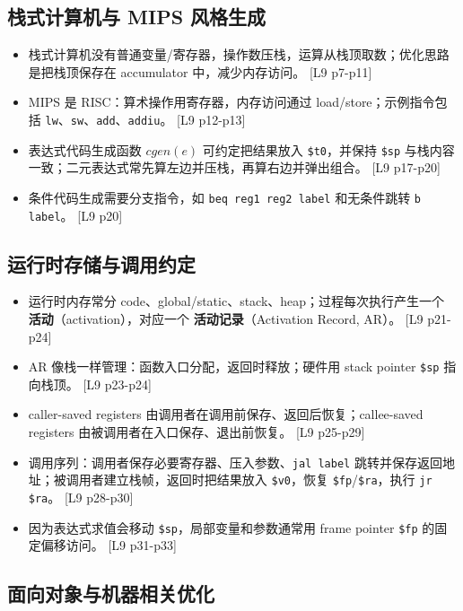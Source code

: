 \documentclass[UTF8,fontset=none,11pt]{ctexart}
\newcommand{\pg}[1]{{\scriptsize\textcolor{citegray}{[#1]}}}
\newcommand{\term}[2]{\textbf{#1}（#2）}
\newcommand{\code}[1]{\texttt{#1}}
\begin{document}
\subsection{栈式计算机与 MIPS 风格生成}

\begin{itemize}
  \item 栈式计算机没有普通变量/寄存器，操作数压栈，运算从栈顶取数；优化思路是把栈顶保存在 accumulator 中，减少内存访问。 \pg{L9 p7-p11}
  \item MIPS 是 RISC：算术操作用寄存器，内存访问通过 load/store；示例指令包括 \code{lw}、\code{sw}、\code{add}、\code{addiu}。 \pg{L9 p12-p13}
  \item 表达式代码生成函数 \(cgen(e)\) 可约定把结果放入 \code{\$t0}，并保持 \code{\$sp} 与栈内容一致；二元表达式常先算左边并压栈，再算右边并弹出组合。 \pg{L9 p17-p20}
  \item 条件代码生成需要分支指令，如 \code{beq reg1 reg2 label} 和无条件跳转 \code{b label}。 \pg{L9 p20}
\end{itemize}

\subsection{运行时存储与调用约定}

\begin{itemize}
  \item 运行时内存常分 code、global/static、stack、heap；过程每次执行产生一个 \term{活动}{activation}，对应一个 \term{活动记录}{Activation Record, AR}。 \pg{L9 p21-p24}
  \item AR 像栈一样管理：函数入口分配，返回时释放；硬件用 stack pointer \code{\$sp} 指向栈顶。 \pg{L9 p23-p24}
  \item caller-saved registers 由调用者在调用前保存、返回后恢复；callee-saved registers 由被调用者在入口保存、退出前恢复。 \pg{L9 p25-p29}
  \item 调用序列：调用者保存必要寄存器、压入参数、\code{jal label} 跳转并保存返回地址；被调用者建立栈帧，返回时把结果放入 \code{\$v0}，恢复 \code{\$fp}/\code{\$ra}，执行 \code{jr \$ra}。 \pg{L9 p28-p30}
  \item 因为表达式求值会移动 \code{\$sp}，局部变量和参数通常用 frame pointer \code{\$fp} 的固定偏移访问。 \pg{L9 p31-p33}
\end{itemize}

\subsection{面向对象与机器相关优化}
\end{document}
